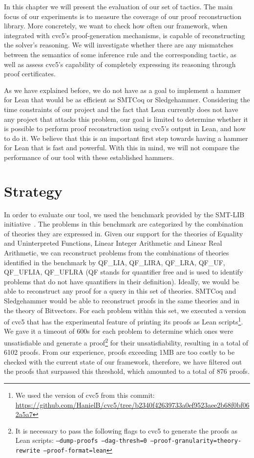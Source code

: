 In this chapter we will present the evaluation of our set of tactics.
%
The main focus of our experiments is to measure the coverage
of our proof reconstruction library.
%
More concretely, we want to check how often our framework, when
integrated with cvc5's proof-generation mechanisms, is capable
of reconstructing the solver's reasoning.
%
We will investigate whether there are any mismatches between
the semantics of some inference rule and the corresponding tactic,
as well as assess cvc5's capability of completely expressing
its reasoning through proof certificates.

As we have explained before, we do not have as a goal to implement a hammer
for Lean that would be as efficient as SMTCoq or Sledgehammer.
%
Considering the time constraints of our project and the fact that
Lean currently does not have any project that attacks this problem, our goal
is limited to determine whether it is possible to perform proof reconstruction
using cvc5's output in Lean, and how to do it.
%
We believe that this is an important first step towards having
a hammer for Lean that is fast and powerful.
%
With this in mind, we will not compare the performance of our tool
with these established hammers.

\section{Strategy}

In order to evaluate our tool, we used the benchmark provided
by the SMT-LIB initiative~\cite{smtlib_initiative}. The problems in this benchmark
are categorized by the combination of theories they are expressed in.
Given our support for the theories of Equality and Uninterpreted Functions,
Linear Integer Arithmetic and Linear Real Arithmetic, we can reconstruct problems
from the combinations of theories identified in the benchmark by QF\_LIA, QF\_LIRA,
QF\_LRA, QF\_UF, QF\_UFLIA, QF\_UFLRA (QF stands for quantifier free and is used
to identify problems that do not have quantifiers in their definition).
%
Ideally, we would be able to reconstruct any proof for a query
in this set of theories.
%
SMTCoq and Sledgehammer would be able to reconstruct proofs in the
same theories and in the theory of Bitvectors.
%
For each problem within this set, we executed a version of cvc5 that has the experimental feature of printing its proofs as Lean scripts\footnote{We used the version of
  cvc5 from this commit: \url{https://github.com/HanielB/cvc5/tree/b2340f42639733a0ef9523aee2b68f0bf062a5a7}}.
We gave it a timeout of 600s for each problem to determine
which ones were unsatisfiable and generate a proof\footnote{It is necessary to pass the following
  flags to cvc5 to generate the proofs as Lean scripts: \texttt{--dump-proofs --dag-thresh=0
    --proof-granularity=theory-rewrite --proof-format=lean}} for their unsatisfiability,
resulting in a total of 6102 proofs.
%
From our experience, proofs exceeding 1MB are too costly to be checked
with the current state of our framework, therefore, we have filtered out the proofs
that surpassed this threshold, which amounted to a total of 876 proofs.


